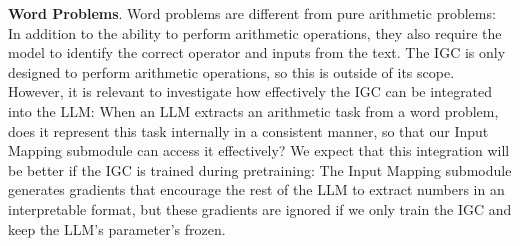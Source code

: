 \documentclass[11pt]{article}
\begin{document}
\textbf{Word Problems}.
Word problems are different from pure arithmetic problems: In addition to the ability to perform arithmetic operations, they also require the model to identify the correct operator and inputs from the text.
The IGC is only designed to perform arithmetic operations, so this is outside of its scope. However, it is relevant to investigate how effectively the IGC can be integrated into the LLM: When an LLM extracts an arithmetic task from a word problem, does it represent this task internally in a consistent manner, so that our Input Mapping submodule can access it effectively?
We expect that this integration will be better if the IGC is trained during pretraining: The Input Mapping submodule generates gradients that encourage the rest of the LLM to extract numbers in an interpretable format, but these gradients are ignored if we only train the IGC and keep the LLM's parameter's frozen.




\end{document}

